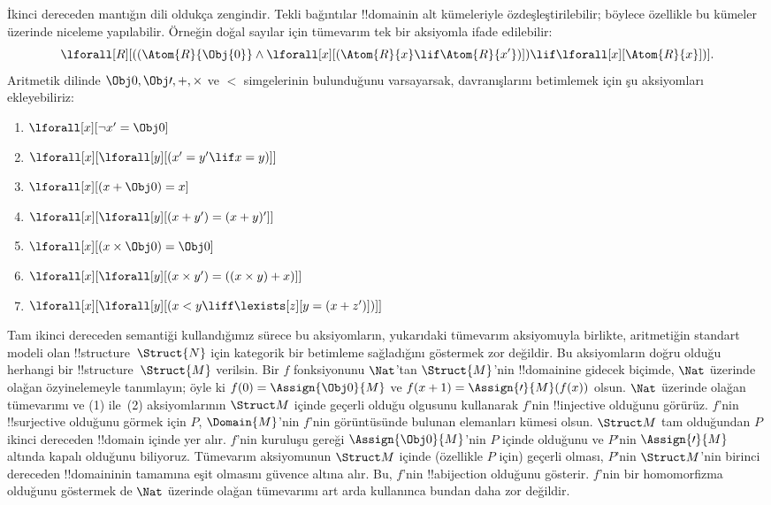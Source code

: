 \documentclass[../../../include/open-logic-section]{subfiles}
\begin{document}
İkinci dereceden mantığın dili oldukça zengindir. Tekli bağıntılar !!{domain}{}in
alt kümeleriyle özdeşleştirilebilir; böylece özellikle bu kümeler üzerinde
niceleme yapılabilir. Örneğin doğal sayılar için tümevarım tek bir aksiyomla
ifade edilebilir:
\[
\lforall[R][((\Atom{R}{\Obj{0}} \land \lforall[x][(\Atom{R}{x} \lif
    \Atom{R}{x'})]) \lif \lforall[x][\Atom{R}{x}])].
\]
Aritmetik dilinde $\Obj 0, \Obj \prime, +, \times$ ve $<$ simgelerinin
bulunduğunu varsayarsak, davranışlarını betimlemek için şu aksiyomları
ekleyebiliriz:
\begin{enumerate}
\item $\lforall[x][\lnot x' = \Obj 0]$
\item $\lforall[x][\lforall[y][(x' = y' \lif x = y)]]$
\item $\lforall[x][(x + \Obj 0) = x]$
\item $\lforall[x][\lforall[y][(x + y') = (x + y)']]$
\item $\lforall[x][(x \times \Obj 0) = \Obj 0]$
\item $\lforall[x][\lforall[y][(x \times y') = ((x \times y) + x)]]$
\item $\lforall[x][\lforall[y][(x < y \liff \lexists[z][y = (x + z')])]]$
\end{enumerate}
Tam ikinci dereceden semantiği kullandığımız sürece bu aksiyomların, yukarıdaki
tümevarım aksiyomuyla birlikte, aritmetiğin standart modeli olan
!!{structure}~$\Struct{N}$ için kategorik bir betimleme sağladığını göstermek
zor değildir. Bu aksiyomların doğru olduğu herhangi bir
!!{structure}~$\Struct{M}$ verilsin. Bir $f$ fonksiyonunu $\Nat$'tan
$\Struct{M}$'nin !!{domain}{}ine gidecek biçimde, $\Nat$ üzerinde olağan
özyinelemeyle tanımlayın; öyle ki $f(0) = \Assign{\Obj 0}{M}$ ve
$f(x+1) = \Assign{\prime}{M}(f(x))$ olsun. $\Nat$ üzerinde olağan tümevarımı ve
(1) ile~(2) aksiyomlarının
$\Struct M$ içinde geçerli olduğu olgusunu kullanarak $f$'nin !!{injective}
olduğunu görürüz. $f$'nin !!{surjective} olduğunu görmek için $P$,
$\Domain{M}$'nin $f$'nin görüntüsünde bulunan elemanları kümesi olsun.
$\Struct M$ tam olduğundan $P$ ikinci dereceden !!{domain} içinde yer alır.
$f$'nin kuruluşu
gereği $\Assign{\Obj 0}{M}$'nin $P$ içinde olduğunu ve $P$'nin
$\Assign{\prime}{M}$ altında kapalı olduğunu biliyoruz. Tümevarım aksiyomunun
$\Struct M$ içinde (özellikle $P$ için) geçerli olması, $P$'nin $\Struct M$'nin
birinci dereceden !!{domain}{}inin tamamına eşit olmasını güvence altına alır.
Bu, $f$'nin !!a{bijection} olduğunu gösterir. $f$'nin bir homomorfizma olduğunu
göstermek de $\Nat$ üzerinde olağan tümevarımı art arda kullanınca bundan daha
zor değildir.
\end{document}
